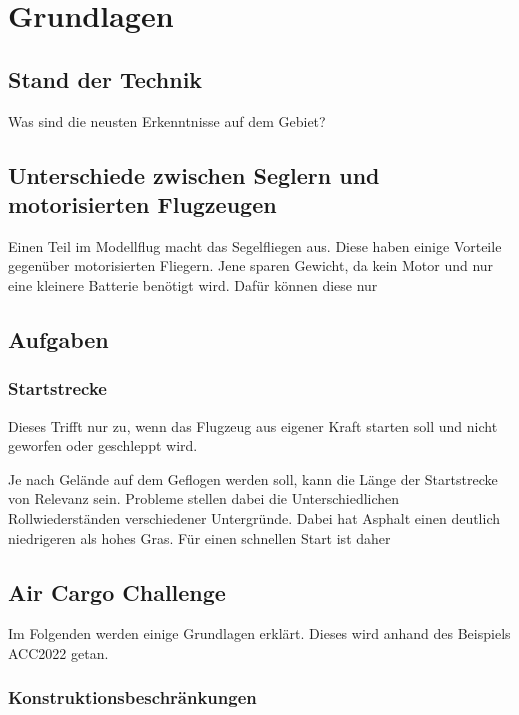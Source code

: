 \chapter{Grundlagen}
\label{chap2:grundlagen}
\section{Stand der Technik}
\label{sec:sdt}
Was sind die neusten Erkenntnisse auf dem Gebiet?

\section{Unterschiede zwischen Seglern und motorisierten Flugzeugen}

Einen Teil im Modellflug macht das Segelfliegen aus. Diese haben einige Vorteile gegenüber motorisierten Fliegern. Jene sparen Gewicht, da kein Motor und nur eine kleinere Batterie benötigt wird. Dafür können diese nur 


\section[short]{Aufgaben}

\subsection*{Startstrecke}
Dieses Trifft nur zu, wenn das Flugzeug aus eigener Kraft starten soll und nicht geworfen oder geschleppt wird.

Je nach Gelände auf dem Geflogen werden soll, kann die Länge der Startstrecke von Relevanz sein. Probleme stellen dabei die Unterschiedlichen Rollwiederständen verschiedener Untergründe. Dabei hat Asphalt einen deutlich niedrigeren als hohes Gras. Für einen schnellen Start ist daher 

\section{Air Cargo Challenge}

Im Folgenden werden einige Grundlagen erklärt. Dieses wird anhand des Beispiels ACC2022 getan.

\subsection{Konstruktionsbeschränkungen}

